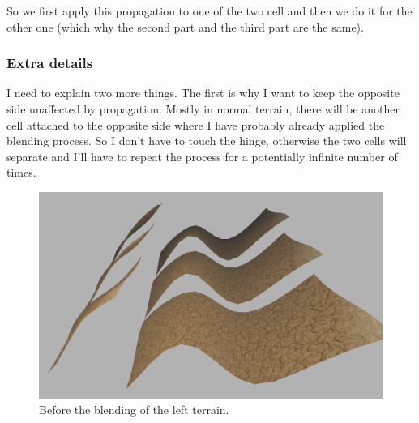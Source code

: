 \newpage

\noindent
So we first apply this propagation to one of the two cell and then we do it for the other one (which why the second part and the third part are the same).

\begin{figure}[hbt!]
	\centering
	\qquad
	\caption{}
	\label{fig::thirdTerrain}
\end{figure}

\subsubsection{Extra details}
I need to explain two more things. The first is why I want to keep the opposite side unaffected by propagation. Mostly in normal terrain, there will be another cell attached to the opposite side where I have probably already applied the blending process. So I don't have to touch the hinge, otherwise the two cells will separate and I'll have to repeat the process for a potentially infinite number of times.

\begin{figure}[hbt!]
	\centering
	\includegraphics[width= 0.60
	\textwidth]{images/terrain6.png}
	\caption{Before the blending of the left terrain.}
\end{figure} 

